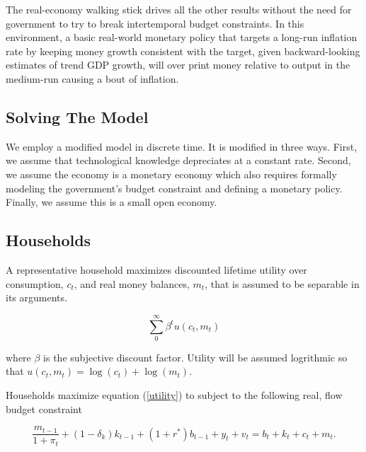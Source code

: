 \documentclass{OUP-EJ}
\begin{document}
The real-economy walking stick drives all the other results without the need for government to try to break intertemporal budget constraints. In this environment, a basic real-world monetary policy that targets a long-run inflation rate by keeping money growth consistent with the target, given backward-looking estimates of trend GDP growth, will over print money relative to output in the medium-run causing a bout of inflation.

\subsection{Solving The Model}

We employ a modified \cite{Romer1990} model in discrete time.  It is modified in three ways. First, we assume that technological knowledge depreciates at a constant rate. Second, we assume the economy is a monetary economy which also requires formally modeling the government's budget constraint and defining a monetary policy. Finally, we assume this is a small open economy.

\subsection{Households}

A representative household maximizes discounted lifetime utility over consumption, $c_t$, and real money balances, $m_t$, that is assumed to be separable in its arguments. 

\begin{equation}
    \label{utility}
    \sum_0^{\infty} \beta^t u(c_t,m_t)
\end{equation}

where $\beta$ is the subjective discount factor.  Utility will be assumed logrithmic so that $u(c_t,m_t)= \log (c_t) + \log (m_t)$.

Households maximize equation (\ref{utility}) to subject to the following real, flow budget constraint

\begin{equation}
    \label{real budget}
    \frac{m_{t-1}}{1+\pi_t}+ (1-\delta_k) k_{t-1} + (1+r^*)b_{t-1} + y_t + v_t  = b_t + k_t + c_t + m_t.
\end{equation}
\end{document}
